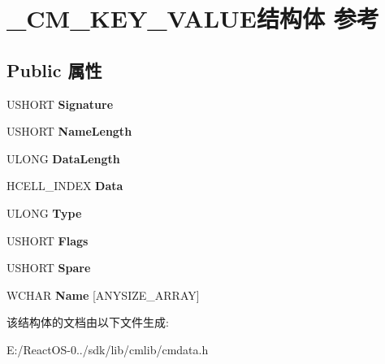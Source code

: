 \hypertarget{struct___c_m___k_e_y___v_a_l_u_e}{}\section{\+\_\+\+C\+M\+\_\+\+K\+E\+Y\+\_\+\+V\+A\+L\+U\+E结构体 参考}
\label{struct___c_m___k_e_y___v_a_l_u_e}
\subsection*{Public 属性}
\begin{DoxyCompactItemize}
\item 
\mbox{\label{struct___c_m___k_e_y___v_a_l_u_e_a016cae6dde056c05fe9abc8dbee7cfb5}} 
U\+S\+H\+O\+RT {\bfseries Signature}
\item 
\mbox{\label{struct___c_m___k_e_y___v_a_l_u_e_a9277bb9fed0acedb603bf176c2981706}} 
U\+S\+H\+O\+RT {\bfseries Name\+Length}
\item 
\mbox{\label{struct___c_m___k_e_y___v_a_l_u_e_aff666e04e2491482a81d4fe9059c5160}} 
U\+L\+O\+NG {\bfseries Data\+Length}
\item 
\mbox{\label{struct___c_m___k_e_y___v_a_l_u_e_a2c81a11c12a6f7bcaa7b3bbb7be3b328}} 
H\+C\+E\+L\+L\+\_\+\+I\+N\+D\+EX {\bfseries Data}
\item 
\mbox{\label{struct___c_m___k_e_y___v_a_l_u_e_a272a48ada5053b79913425ddb3a4584d}} 
U\+L\+O\+NG {\bfseries Type}
\item 
\mbox{\label{struct___c_m___k_e_y___v_a_l_u_e_ab8b86477a11c35da8edd770e1c61ba9b}} 
U\+S\+H\+O\+RT {\bfseries Flags}
\item 
\mbox{\label{struct___c_m___k_e_y___v_a_l_u_e_a58d21b6e0250b2483dc12851bc148c2a}} 
U\+S\+H\+O\+RT {\bfseries Spare}
\item 
\mbox{\label{struct___c_m___k_e_y___v_a_l_u_e_a374754e631a0585482b0eca1baf96b11}} 
W\+C\+H\+AR {\bfseries Name} \mbox{[}A\+N\+Y\+S\+I\+Z\+E\+\_\+\+A\+R\+R\+AY\mbox{]}
\end{DoxyCompactItemize}


该结构体的文档由以下文件生成\+:\begin{DoxyCompactItemize}
\item 
E\+:/\+React\+O\+S-\/0../sdk/lib/cmlib/cmdata.\+h\end{DoxyCompactItemize}
